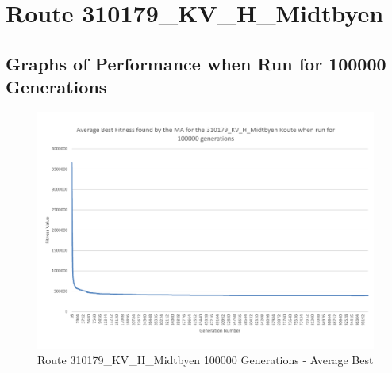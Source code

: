 




\section{Route 310179\_KV\_H\_Midtbyen} %
\label{sec:route_310179_kv_h_midtbyen}

\subsection{Graphs of Performance when Run for 100000 Generations} %
\label{sub:graphs_of_performance_when_run_for_100000_generations_KV_H}

\begin{landscape}
\begin{figure}[thbp]
	\centerline{\includegraphics[height=0.945\textwidth]{figures/Trondheim_graphs/KV_H/KV_H-100k_average_best.pdf}}
	\caption{Route 310179\_KV\_H\_Midtbyen 100000 Generations - Average Best}
	\label{fig:KV_H_100k_ab}
\end{figure}
\end{landscape}

